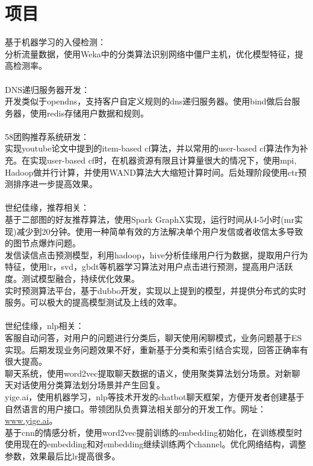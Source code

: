 \documentclass[11pt, a4paper]{article}
\begin{document}
\section*{项目}

基于机器学习的入侵检测： \\
分析流量数据，使用Weka中的分类算法识别网络中僵尸主机，优化模型特征，提高检测率。 \\
\\
DNS递归服务器开发： \\
开发类似于opendns，支持客户自定义规则的dns递归服务器。使用bind做后台服务器，使用redis存储用户数据和规则。 \\
\\
58团购推荐系统研发： \\
实现youtube论文中提到的item-based cf算法，并以常用的user-based cf算法作为补充。在实现user-based cf时，在机器资源有限且计算量很大的情况下，使用mpi, Hadoop做并行计算，并使用WAND算法大大缩短计算时间。后处理阶段使用ctr预测排序进一步提高效果。 \\
\\
世纪佳缘，推荐相关： \\
基于二部图的好友推荐算法，使用Spark GraphX实现，运行时间从4-5小时(mr实现)减少到20分钟。使用一种简单有效的方法解决单个用户发信或者收信太多导致的图节点爆炸问题。 \\
发信读信点击预测模型，利用hadoop，hive分析佳缘用户行为数据，提取用户行为特征，使用lr，svd，gbdt等机器学习算法对用户点击进行预测，提高用户活跃度。测试模型融合，持续优化效果。 \\
实时预测算法平台，基于dubbo开发，实现以上提到的模型，并提供分布式的实时服务。可以极大的提高模型测试及上线的效率。 \\
\\
世纪佳缘，nlp相关： \\
客服自动问答，对用户的问题进行分类后，聊天使用闲聊模式，业务问题基于ES实现。后期发现业务问题效果不好，重新基于分类和索引结合实现，回答正确率有很大提高。 \\
聊天系统，使用word2vec提取聊天数据的语义，使用聚类算法划分场景。对新聊天对话使用分类算法划分场景并产生回复。 \\
yige.ai，使用机器学习，nlp等技术开发的chatbot聊天框架，方便开发者创建基于自然语言的用户接口。带领团队负责算法相关部分的开发工作。网址：\href{http://www.yige.ai/}{www.yige.ai}。 \\
基于cnn的情感分析，使用word2vec提前训练的embedding初始化，在训练模型时使用现在的embedding和对embedding继续训练两个channel。优化网络结构，调整参数，效果最后比lr提高很多。 \\
\end{document}
